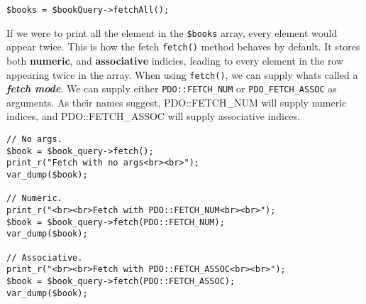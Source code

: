 \documentclass{report}
\begin{document}
\begin{verbatim}
$books = $bookQuery->fetchAll();
\end{verbatim}
If we were to print all the element in the \texttt{\$books} array, every element would appear twice. This is how  the fetch \texttt{fetch()} method behaves by default. It stores both \textbf{numeric}, and \textbf{associative} indicies, leading to every element in the row appearing twice in the array.
\bigbreak \noindent
When using \texttt{fetch()}, we can supply whats called a \textit{\textbf{fetch mode}}. We can supply either \texttt{PDO::FETCH\_NUM} or \texttt{PDO\_FETCH\_ASSOC} as arguments. As their names suggest, PDO::FETCH\_NUM will supply numeric indices, and PDO::FETCH\_ASSOC will supply associative indices.
\begin{verbatim}
// No args.
$book = $book_query->fetch();
print_r("Fetch with no args<br><br>");
var_dump($book);

// Numeric.
print_r("<br><br>Fetch with PDO::FETCH_NUM<br><br>");
$book = $book_query->fetch(PDO::FETCH_NUM);
var_dump($book);

// Associative.
print_r("<br><br>Fetch with PDO::FETCH_ASSOC<br><br>");
$book = $book_query->fetch(PDO::FETCH_ASSOC);
var_dump($book);
\end{verbatim}
\end{document}
